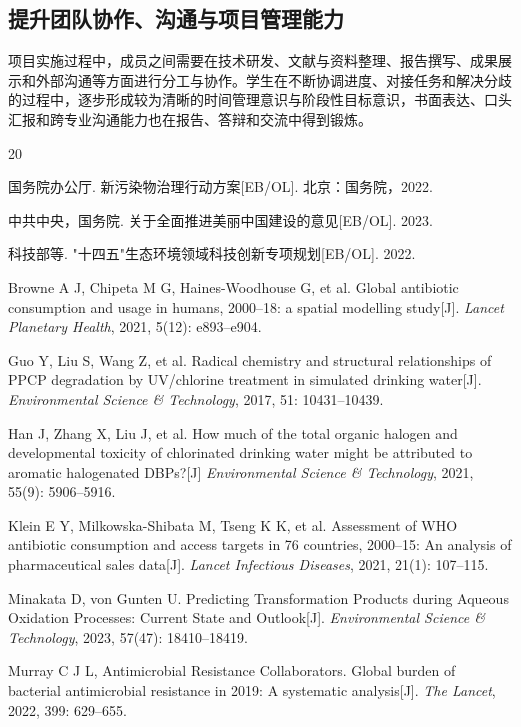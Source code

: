 \documentclass[12pt,a4paper]{article}
\begin{document}
\subsection{提升团队协作、沟通与项目管理能力}

项目实施过程中，成员之间需要在技术研发、文献与资料整理、报告撰写、成果展示和外部沟通等方面进行分工与协作。学生在不断协调进度、对接任务和解决分歧的过程中，逐步形成较为清晰的时间管理意识与阶段性目标意识，书面表达、口头汇报和跨专业沟通能力也在报告、答辩和交流中得到锻炼。

\newpage
\begin{thebibliography}{20}

 国务院办公厅. 新污染物治理行动方案[EB/OL]. 北京：国务院，2022.

 中共中央，国务院. 关于全面推进美丽中国建设的意见[EB/OL]. 2023.

 科技部等. "十四五"生态环境领域科技创新专项规划[EB/OL]. 2022.

 Browne A J, Chipeta M G, Haines-Woodhouse G, et al. Global antibiotic consumption and usage in humans, 2000--18: a spatial modelling study[J]. \textit{Lancet Planetary Health}, 2021, 5(12): e893--e904.

 Guo Y, Liu S, Wang Z, et al. Radical chemistry and structural relationships of PPCP degradation by UV/chlorine treatment in simulated drinking water[J]. \textit{Environmental Science \& Technology}, 2017, 51: 10431--10439.

 Han J, Zhang X, Liu J, et al. How much of the total organic halogen and developmental toxicity of chlorinated drinking water might be attributed to aromatic halogenated DBPs?[J] \textit{Environmental Science \& Technology}, 2021, 55(9): 5906--5916.

 Klein E Y, Milkowska-Shibata M, Tseng K K, et al. Assessment of WHO antibiotic consumption and access targets in 76 countries, 2000--15: An analysis of pharmaceutical sales data[J]. \textit{Lancet Infectious Diseases}, 2021, 21(1): 107--115.

 Minakata D, von Gunten U. Predicting Transformation Products during Aqueous Oxidation Processes: Current State and Outlook[J]. \textit{Environmental Science \& Technology}, 2023, 57(47): 18410--18419.

 Murray C J L, Antimicrobial Resistance Collaborators. Global burden of bacterial antimicrobial resistance in 2019: A systematic analysis[J]. \textit{The Lancet}, 2022, 399: 629--655.


\end{thebibliography}
\end{document}
